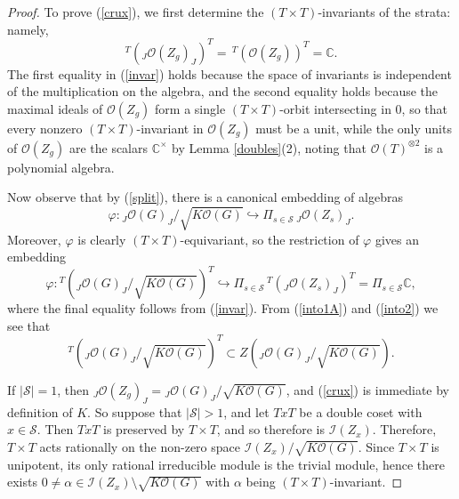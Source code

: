 \documentclass{amsart}
\numberwithin{equation}{section}
\theoremstyle{definition}
\begin{document}
\begin{proof}
To prove (\ref{crux}), we first determine the $(T\times T)$-invariants of the strata: namely,
\begin{equation}\label{invar} 
{}^T\left({}_J\mathcal{O}(Z_g)_J\right)^T=\,{}^T\left({}\mathcal{O}(Z_g)\right)^T=\mathbb{C}.
\end{equation}
The first equality in (\ref{invar}) holds because the space of invariants is independent of the multiplication on the algebra, and the second equality holds because the maximal ideals of $\mathcal{O}(Z_g)$ form a single $(T \times T)$-orbit intersecting in ${0}$, so that every nonzero $(T \times T)$-invariant in $\mathcal{O}(Z_g)$ must be a unit, while the only units of $\mathcal{O}(Z_g)$ are the scalars $\mathbb{C}^{\times}$ by Lemma \ref{doubles}(2), noting that $\mathcal{O}(T)^{\otimes 2}$ is a polynomial algebra.   

Now observe that by (\ref{split}), there is a canonical embedding of algebras
\begin{equation}\label{into1A} 
\varphi : {}_J\mathcal{O}(G)_J/\sqrt{K\mathcal{O}(G)} \hookrightarrow \Pi_{s \in \mathcal{S}}\,{}_J\mathcal{O}(Z_s)_J.
\end{equation}
Moreover, $\varphi$ is clearly $(T\times T)$-equivariant, so the restriction of $\varphi$ gives an embedding
\begin{equation}\label{into2} 
\varphi:{}^T\left({}_J\mathcal{O}(G)_J/\sqrt{K\mathcal{O}(G)}\right)^T \hookrightarrow \Pi_{s \in \mathcal{S}}\, {}^T({}_J\mathcal{O}(Z_s)_J)^T= \Pi_{s \in \mathcal{S}}\mathbb{C}, 
\end{equation}
where the final equality follows from (\ref{invar}). From (\ref{into1A}) and (\ref{into2}) we see that
\begin{equation}\label{caught}  
{}^T\left({}_J\mathcal{O}(G)_J/\sqrt{K\mathcal{O}(G)}\right)^T \subset Z\left({}_J\mathcal{O}(G)_J/\sqrt{K\mathcal{O}(G)}\right).
\end{equation}

If $|\mathcal{S}| = 1$, then ${}_J\mathcal{O}(Z_g)_J={}_J\mathcal{O}(G)_J/\sqrt{K\mathcal{O}(G)}$, and (\ref{crux}) is immediate by definition of $K$. So suppose that $|\mathcal{S}| > 1$, and let $TxT$ be a double coset with $x \in \mathcal{S}$. Then $T x T$ is preserved by $T \times T$, and so therefore is $\mathcal{I}(Z_x)$. Therefore, $T \times T$ acts rationally on the non-zero space $\mathcal{I}(Z_x)/\sqrt{K\mathcal{O}(G)}$. Since $T \times T$ is unipotent, its only rational irreducible module is the trivial module, hence there exists $0 \neq \alpha \in \mathcal{I}(Z_x) \setminus \sqrt{K\mathcal{O}(G)}$ with $\alpha$ being $(T \times T)$-invariant. 


\end{proof}
\end{document}
